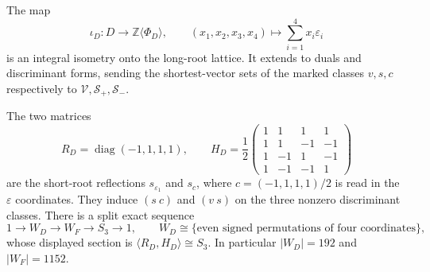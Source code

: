 \begin{theorem}
\label{esn:thm:d4-f4-triality}
The map
\begin{equation}
 \iota_D:D\longrightarrow\mathbb Z\langle\Phi_D\rangle,
 \qquad(x_1,x_2,x_3,x_4)\longmapsto
                         \sum_{i=1}^4x_i\varepsilon_i
 \label{esn:eq:d4-isometry}
\end{equation}
is an integral isometry onto the long-root lattice.  It extends to duals
and discriminant forms, sending the shortest-vector sets of the marked
classes \(v,s,c\) respectively to
\(\mathcal V,\mathcal S_+,\mathcal S_-\).

The two matrices
\begin{equation}
 R_D=\operatorname{diag}(-1,1,1,1),\qquad
 H_D=\frac12\begin{pmatrix}
 1&1&1&1\\1&1&-1&-1\\1&-1&1&-1\\1&-1&-1&1
 \end{pmatrix}
 \label{esn:eq:d4-triality-matrices}
\end{equation}
are the short-root reflections \(s_{\varepsilon_1}\) and \(s_c\),
where \(c=(-1,1,1,1)/2\) is read in the \(\varepsilon\) coordinates.
They induce \((s\ c)\) and \((v\ s)\) on the three nonzero
discriminant classes.  There is a split exact sequence
\begin{equation}
 1\longrightarrow W_D\longrightarrow W_F
   \longrightarrow S_3\longrightarrow1,
 \qquad W_D\cong\{\text{even signed permutations of four coordinates}\},
 \label{esn:eq:weyl-triality-sequence}
\end{equation}
whose displayed section is \(\langle R_D,H_D\rangle\cong S_3\).
In particular \(|W_D|=192\) and \(|W_F|=1152\).
\end{theorem}

